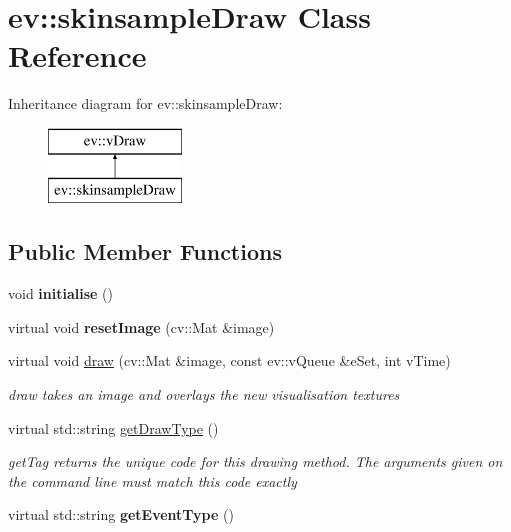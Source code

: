 \hypertarget{classev_1_1skinsampleDraw}{}\section{ev\+:\+:skinsample\+Draw Class Reference}
\label{classev_1_1skinsampleDraw}
Inheritance diagram for ev\+:\+:skinsample\+Draw\+:\begin{figure}[H]
\begin{center}
\leavevmode
\includegraphics[height=2.000000cm]{classev_1_1skinsampleDraw}
\end{center}
\end{figure}
\subsection*{Public Member Functions}
\begin{DoxyCompactItemize}
\item 
\mbox{\label{classev_1_1skinsampleDraw_a1ea80b10daa9076585204aa3e30613c1}} 
void {\bfseries initialise} ()
\item 
\mbox{\label{classev_1_1skinsampleDraw_a0cf801e4cf816bb9c6ab4a2eb16dfe44}} 
virtual void {\bfseries reset\+Image} (cv\+::\+Mat \&image)
\item 
virtual void \hyperlink{classev_1_1skinsampleDraw_a1c2492038e7fe94fe88d2286ac18f2c6}{draw} (cv\+::\+Mat \&image, const ev\+::v\+Queue \&e\+Set, int v\+Time)
\begin{DoxyCompactList}\small\item\em draw takes an image and overlays the new visualisation textures \end{DoxyCompactList}\item 
virtual std\+::string \hyperlink{classev_1_1skinsampleDraw_a32064d959f2c127d25a9fa6773384850}{get\+Draw\+Type} ()
\begin{DoxyCompactList}\small\item\em get\+Tag returns the unique code for this drawing method. The arguments given on the command line must match this code exactly \end{DoxyCompactList}\item 
\mbox{\label{classev_1_1skinsampleDraw_a7b7075fd4bf79d11456df8dc9b5c42a5}} 
virtual std\+::string {\bfseries get\+Event\+Type} ()
\end{DoxyCompactItemize}
